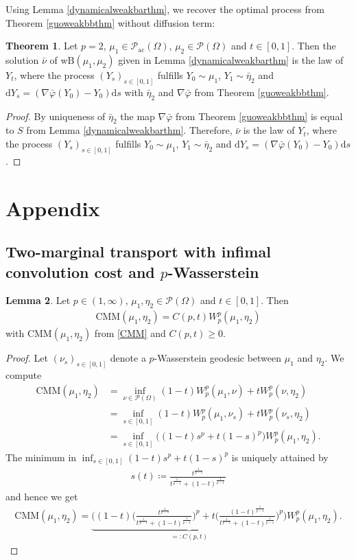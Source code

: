 \documentclass[letterpaper]{amsart}
\newcommand{\dd}{\mathrm{d}}
\theoremstyle{definition}
\newtheorem{thm}{Theorem}[section]
\newtheorem{lma}[thm]{Lemma}
\begin{document}
Using Lemma \ref{dynamicalweakbarthm}, we recover the optimal process from Theorem \ref{guoweakbbthm} without diffusion term:
\begin{thm}\label{weakBBrelthm}
	Let $p=2$, $\mu_1\in\mathcal P_{\text{ac}}(\Omega)$, $\mu_2\in\mathcal P(\Omega)$ and $t\in[0,1]$.
	Then the solution $\bar\nu$ of $\text{wB}(\mu_1,\mu_2)$ given in Lemma \ref{dynamicalweakbarthm} is the law of $Y_t$, where the process $(Y_s)_{s\in[0,1]}$ fulfills $Y_0\sim\mu_1$, $Y_1\sim\bar\eta_2$ and $\dd Y_s=(\nabla\bar\varphi(Y_0)-Y_0)\dd s$ with $\bar\eta_2$ and $\nabla\bar\varphi$ from Theorem \ref{guoweakbbthm}.
\end{thm}
\begin{proof}
	By uniqueness of $\bar\eta_2$ the map $\nabla\bar\varphi$ from Theorem \ref{guoweakbbthm} is equal to $S$ from Lemma \ref{dynamicalweakbarthm}. Therefore, $\bar\nu$ is the law of $Y_t$, where the process $(Y_s)_{s\in[0,1]}$ fulfills $Y_0\sim\mu_1$, $Y_1\sim\bar\eta_2$ and $\dd Y_s=(\nabla\bar\varphi(Y_0)-Y_0)\dd s$.
\end{proof}
\section{Appendix}
\subsection{Two-marginal transport with infimal convolution cost and $p$-Wasserstein}
\begin{lma}\label{cMMW_plma}
	Let $p\in(1,\infty)$, $\mu_1,\eta_2\in\mathcal P(\Omega)$ and $t\in[0,1]$. Then
	\begin{gather*}
		\text{CMM}(\mu_1,\eta_2)=C(p,t)W_p^p(\mu_1,\eta_2)
	\end{gather*}
	with $\text{CMM}(\mu_1,\eta_2)$ from \eqref{CMM} and $C(p,t)\geq 0$.
\end{lma}
\begin{proof}
	Let $(\nu_s)_{s\in[0,1]}$ denote a $p$-Wasserstein geodesic between $\mu_1$ and $\eta_2$.
	We compute
	\begin{align*}
		\text{CMM}(\mu_1,\eta_2)&=\inf_{\nu\in \mathcal P(\Omega)}(1-t)W_p^p(\mu_1,\nu)+tW_p^p(\nu,\eta_2)\\
		&=\inf_{s\in[0,1]}(1-t)W_p^p(\mu_1,\nu_s)+tW_p^p(\nu_s,\eta_2)\\
		&=\inf_{s\in[0,1]}\big((1-t)s^p+t(1-s)^p\big)W_p^p(\mu_1,\eta_2).
	\end{align*}
	The minimum in $\inf_{s\in[0,1]}(1-t)s^p+t(1-s)^p$ is uniquely attained by
	\begin{gather*}
		s(t)\coloneqq\frac{t^{\frac{1}{p-1}}}{t^{\frac{1}{p-1}}+(1-t)^{\frac{1}{p-1}}}
	\end{gather*}
	and hence we get
	\begin{gather*}
		\text{CMM}(\mu_1,\eta_2)=\underbrace{\Bigg((1-t)\Big(\frac{t^{\frac{1}{p-1}}}{t^{\frac{1}{p-1}}+(1-t)^{\frac{1}{p-1}}}\Big)^p+t\Big(\frac{(1-t)^{\frac{1}{p-1}}}{t^{\frac{1}{p-1}}+(1-t)^{\frac{1}{p-1}}}\Big)^p\Bigg)}_{=:C(p,t)}W_p^p(\mu_1,\eta_2).
	\end{gather*}
\end{proof}
\end{document}

